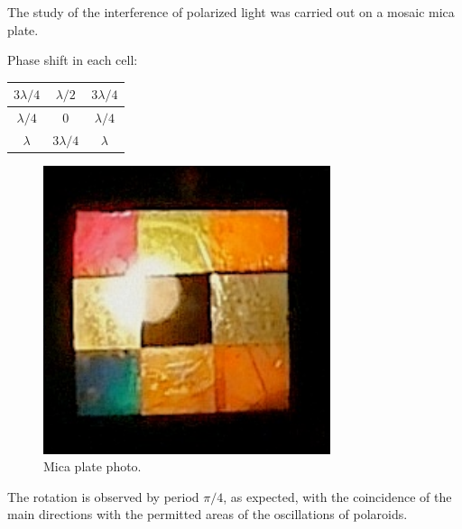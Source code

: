 The study of the interference of polarized light was carried out on a mosaic mica plate.

\phantom{42}

\begin{minipage}{0.55\textwidth}
Phase shift in each cell:
    \begin{center}
	\begin{tabular}{ |c|c|c| } 
		\hline
		$3\lambda/4$ & $\lambda/2$ & $3\lambda/4$ \\
		\hline
		$\lambda/4$ & 0 & $\lambda/4$ \\
 		\hline
 		$\lambda$ & $3\lambda/4$ & $\lambda$ \\
 		\hline
	\end{tabular}
	\end{center}
\end{minipage}
\hfill
\begin{minipage}{0.4\textwidth}

\begin{figure}[h]
    \centering
    \includegraphics[width=0.75\textwidth]{figures/mica.jpg}
    \caption{Mica plate photo.}
\end{figure}

    
\end{minipage}

\phantom{42}

The rotation is observed by period $\pi/4$, as expected, with the coincidence of the main directions with the permitted areas of the oscillations of polaroids.